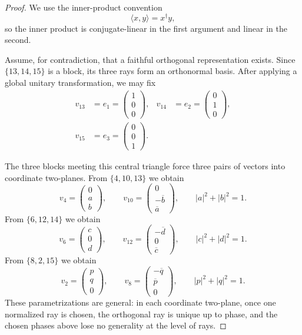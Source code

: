 \documentclass[aps,pra,twocolumn,superscriptaddress,10pt]{revtex4-2}
\begin{document}
\begin{proof}
We use the inner-product convention
\[
    \langle x,y\rangle=x^\dagger y,
\]
so the inner product is conjugate-linear in the first argument and linear in
the second.

Assume, for contradiction, that a faithful orthogonal representation exists.
Since $\{13,14,15\}$ is a block, its three rays form an orthonormal basis.
After applying a global unitary transformation, we may fix
\begin{align*}
    v_{13}&=e_1=\begin{pmatrix}1\\0\\0\end{pmatrix},
    &v_{14}&=e_2=\begin{pmatrix}0\\1\\0\end{pmatrix},\\[-1ex]
    v_{15}&=e_3=\begin{pmatrix}0\\0\\1\end{pmatrix}.
\end{align*}

The three blocks meeting this central triangle force three pairs of vectors
into coordinate two-planes.  From $\{4,10,13\}$ we obtain
\[
    v_4=\begin{pmatrix}0\\a\\b\end{pmatrix},\qquad
    v_{10}=\begin{pmatrix}0\\-\overline b\\\overline a\end{pmatrix},
    \qquad |a|^2+|b|^2=1.
\]
From $\{6,12,14\}$ we obtain
\[
    v_6=\begin{pmatrix}c\\0\\d\end{pmatrix},\qquad
    v_{12}=\begin{pmatrix}-\overline d\\0\\\overline c\end{pmatrix},
    \qquad |c|^2+|d|^2=1.
\]
From $\{8,2,15\}$ we obtain
\[
    v_2=\begin{pmatrix}p\\q\\0\end{pmatrix},\qquad
    v_8=\begin{pmatrix}-\overline q\\\overline p\\0\end{pmatrix},
    \qquad |p|^2+|q|^2=1.
\]
These parametrizations are general: in each coordinate two-plane, once one
normalized ray is chosen, the orthogonal ray is unique up to phase, and the
chosen phases above lose no generality at the level of rays.


\end{proof}
\end{document}

